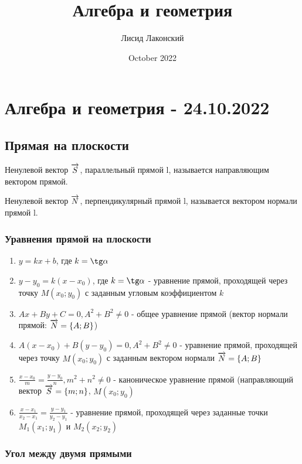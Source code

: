 \documentclass{article}
\title{Алгебра и геометрия}
\author{Лисид Лаконский}
\date{October 2022}
\def\vec{\ensuremath\overrightarrow}
\begin{document}
\maketitle

\tableofcontents
\pagebreak

\section{Алгебра и геометрия - 24.10.2022}

\subsection{Прямая на плоскости}

\begin{flushleft}

Ненулевой вектор $\vec{S}$, параллельный прямой l, называется направляющим вектором прямой.

Ненулевой вектор $\vec{N}$, перпендикулярный прямой l, называется вектором нормали прямой l.

\subsubsection{Уравнения прямой на плоскости}

\begin{enumerate}
    \item $y = k x + b$, где $k = \tg \alpha$
    \item $y - y_0 = k (x - x_0)$, где $k = \tg \alpha$ - уравнение прямой, проходящей через точку $M(x_0; y_0)$ с заданным угловым коэффициентом $k$
    \item $A x + B y + C = 0, A^2 + B^2 \ne 0$ - общее уравнение прямой (вектор нормали прямой: $\vec{N} = \{ A; B \}$)
    \item $A (x - x_0) + B(y - y_0) = 0, A^2 + B^2 \ne 0$ - уравнение прямой, проходящей через точку $M(x_0; y_0)$ с заданным вектором нормали $\vec{N} = \{ A; B \}$
    \item $\frac{x - x_0}{m} = \frac{y - y_0}{n}, m^2 + n^2 \ne 0$ - каноническое уравнение прямой (направляющий вектор $\vec{S} = \{ m; n \}$, $M(x_0; y_0)$
    \item $\frac{x - x_1}{x_2 - x_1} = \frac{y - y_1}{y_2 - y_1}$ - уравнение прямой, проходящей через заданные точки $M_1(x_1; y_1)$ и $M_2(x_2; y_2)$
\end{enumerate}

\subsubsection{Угол между двумя прямыми}


\end{flushleft}
\end{document}
